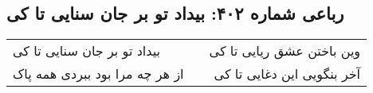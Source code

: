 \begin{center}
\section*{رباعی شماره ۴۰۲: بیداد تو بر جان سنایی تا کی}
\label{sec:sh402}
\begin{longtable}{l p{0.5cm} r}
بیداد تو بر جان سنایی تا کی
&&
وین باختن عشق ریایی تا کی
\\
از هر چه مرا بود ببردی همه پاک
&&
آخر بنگویی این دغایی تا کی
\\
\end{longtable}
\end{center}
